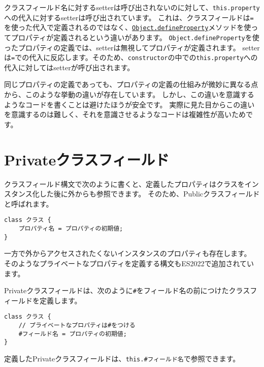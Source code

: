 \begin{tcolorbox}[enhanced jigsaw,breakable,title=クラスフィールドとインスタンスのプロパティの違い]
クラスフィールド名に対するsetterは呼び出されないのに対して、\texttt{this.property}への代入に対するsetterは呼び出されています。
これは、クラスフィールドは\texttt{=}を使った代入で定義されるのではなく、\href{https://developer.mozilla.org/ja/docs/Web/JavaScript/Reference/Global_Objects/Object/defineProperty}{\texttt{Object.defineProperty}}メソッドを使ってプロパティが定義されるという違いがあります。
\texttt{Object.defineProperty}を使ったプロパティの定義では、setterは無視してプロパティが定義されます。
setterは\texttt{=}での代入に反応します。そのため、\texttt{constructor}の中での\texttt{this.property}への代入に対してはsetterが呼び出されます。

同じプロパティの定義であっても、プロパティの定義の仕組みが微妙に異なる点から、このような挙動の違いが存在しています。
しかし、この違いを意識するようなコードを書くことは避けたほうが安全です。
実際に見た目からこの違いを意識するのは難しく、それを意識させるようなコードは複雑性が高いためです。
\end{tcolorbox}

\hypertarget{private-class-fields}{%
\section[Privateクラスフィールド]{Privateクラスフィールド\,\protect{}}\label{private-class-fields}}

クラスフィールド構文で次のように書くと、定義したプロパティはクラスをインスタンス化した後に外からも参照できます。
そのため、Publicクラスフィールドと呼ばれます。

\begin{lstlisting}
class クラス {
    プロパティ名 = プロパティの初期値;
}
\end{lstlisting}

一方で外からアクセスされたくないインスタンスのプロパティも存在します。
そのようなプライベートなプロパティを定義する構文もES2022で追加されています。

Privateクラスフィールドは、次のように\texttt{\#}をフィールド名の前につけたクラスフィールドを定義します。

\begin{lstlisting}
class クラス {
    // プライベートなプロパティは#をつける
    #フィールド名 = プロパティの初期値;
}
\end{lstlisting}

定義したPrivateクラスフィールドは、\texttt{this.\#フィールド名}で参照できます。

